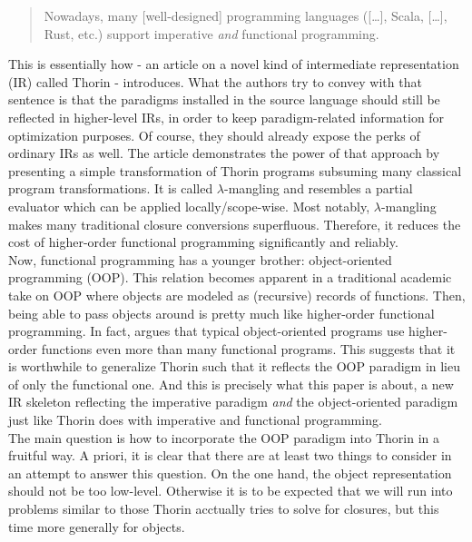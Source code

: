 \begin{quotation}
  Nowadays, many [well-designed] programming languages ([\ldots], Scala, [\ldots], Rust, etc.) support imperative \textit{and} functional programming.
\end{quotation}
This is essentially how \citet{7e4a991f} - an article on a novel kind of intermediate representation (IR) called Thorin - introduces.
What the authors try to convey with that sentence is that the paradigms installed in the source language should still be reflected in higher-level IRs, in order to keep paradigm-related information for optimization purposes.
Of course, they should already expose the perks of ordinary IRs as well.
The article demonstrates the power of that approach by presenting a simple transformation of Thorin programs subsuming {\glqq}many classical program transformations{\grqq}.
It is called $\lambda$-mangling and resembles a partial evaluator which can be applied locally/scope-wise.
Most notably, $\lambda$-mangling makes many traditional closure conversions superfluous. Therefore, it reduces the cost of higher-order functional programming significantly and reliably.
\\
Now, functional programming has a younger brother: object-oriented programming (OOP).
This relation becomes apparent in a traditional academic take on OOP where objects are modeled as (recursive) records of functions.
Then, being able to pass objects around is pretty much like higher-order functional programming.
In fact, \citet{cook09understanding} argues that typical object-oriented programs use higher-order functions even more than many functional programs.
This suggests that it is worthwhile to generalize Thorin such that it reflects the OOP paradigm in lieu of only the functional one.
And this is precisely what this paper is about, a new IR skeleton reflecting the imperative paradigm \textit{and} the object-oriented paradigm just like Thorin does with imperative and functional programming.
\\
The main question is how to incorporate the OOP paradigm into Thorin in a fruitful way.
A priori, it is clear that there are at least two things to consider in an attempt to answer this question.
On the one hand, the object representation should not be too low-level.
Otherwise it is to be expected that we will run into problems similar to those Thorin acctually tries to solve for closures, but this time more generally for objects.
